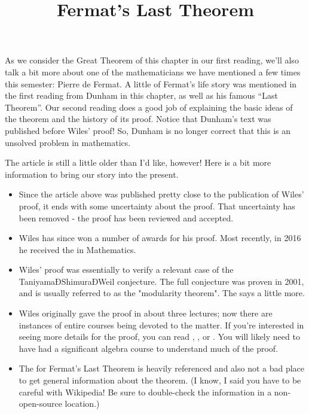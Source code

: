 \documentclass[nooutcomes]{ximera}
\title{Fermat's Last Theorem}
\begin{document}
\begin{abstract}
    
\end{abstract}
\maketitle

As we consider the Great Theorem of this chapter in our first reading, we'll also talk a bit more about one of the mathematicians we have mentioned a few times this semester: Pierre de Fermat.  A little of Fermat's life story was mentioned in the first reading from Dunham in this chapter, as well as his famous ``Last Theorem''.  Our second reading does a good job of explaining the basic ideas of the theorem and the history of its proof.  Notice that Dunham's text was published before Wiles' proof!  So, Dunham is no longer correct that this is an unsolved problem in mathematics.

The article is still a little older than I'd like, however!  Here is a bit more information to bring our story into the present.
\begin{itemize}
	\item Since the article above was published pretty close to the publication of Wiles' proof, it ends with some uncertainty about the proof.  That uncertainty has been removed - the proof has been reviewed and accepted.
	\item Wiles has since won a number of awards for his proof.  Most recently, in 2016 he received the  in Mathematics.  
	\item Wiles' proof was essentially to verify a relevant case of the TaniyamaÐShimuraÐWeil conjecture.  The full conjecture was proven in 2001, and is usually referred to as the "modularity theorem".  The  says a little more.
	\item Wiles originally gave the proof in about three lectures; now there are instances of entire courses being devoted to the matter.  If you're interested in seeing more details for the proof, you can read , , or .  You will likely need to have had a significant algebra course to understand much of the proof.
	\item The  for Fermat's Last Theorem is heavily referenced and also not a bad place to get general information about the theorem.  (I know, I said you have to be careful with Wikipedia!  Be sure to double-check the information in a non-open-source location.)
\end{itemize}
\end{document}
